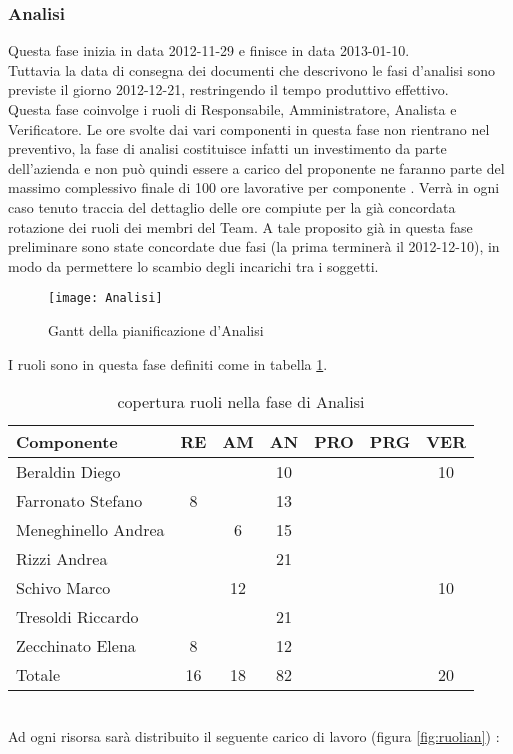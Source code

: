 \subsubsection{Analisi}
Questa fase inizia in data 2012-11-29 e finisce in data 2013-01-10.\\
Tuttavia la data di consegna dei documenti che descrivono le fasi d'analisi sono previste il giorno 2012-12-21, restringendo il tempo produttivo effettivo.\\
Questa fase coinvolge i ruoli di Responsabile, Amministratore, Analista e Verificatore.
Le ore svolte dai vari componenti in questa fase non rientrano nel preventivo, la fase di analisi costituisce infatti un investimento da parte dell’azienda e non può quindi essere a carico del proponente ne faranno parte del massimo complessivo finale di 100 ore lavorative per componente .
Verrà in ogni caso tenuto traccia del dettaglio delle ore compiute per la già concordata rotazione dei ruoli dei membri del Team. A tale proposito già in questa fase preliminare sono state concordate due fasi (la prima terminerà il 2012-12-10), in modo da permettere lo scambio degli incarichi tra i soggetti.
\begin{figure}[h!]
  \texttt{[image: Analisi]}
\caption{Gantt della pianificazione d'Analisi}
\end{figure}
\clearpage
I ruoli sono in questa fase definiti come in tabella \ref{tab:ruolian}.
\begin{table}[h!]
\centering
\begin{tabular}{|l|c|c|c|c|c|c|}
\hline
Componente& RE& AM& AN& PRO& PRG& VER\\
\hline
Beraldin Diego & & & 10& & & 10\\
Farronato Stefano & 8& & 13& & & \\
Meneghinello Andrea & & 6& 15& & & \\
Rizzi Andrea & & & 21& & & \\
Schivo Marco & & 12& & & & 10\\
Tresoldi Riccardo & & & 21& & & \\
Zecchinato Elena & 8& & 12& & & \\
\hline
Totale & 16& 18& 82& & & 20\\
\hline
\end{tabular}
\caption{copertura ruoli nella fase di Analisi}\label{tab:ruolian}
\end{table}\\
Ad ogni risorsa sarà distribuito il seguente carico di lavoro (figura \ref{fig:ruolian}) :\\
